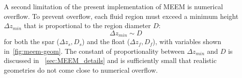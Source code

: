 


A second limitation of the present implementation of MEEM is numerical overflow.
To prevent overflow, each fluid region must exceed a minimum height $ \Delta z_{min}$ that is proportional to the region diameter $D$:
\begin{equation}\label{eq:delta-z-min-intro}
    \Delta z_{min} \sim D
\end{equation}
for both the spar ($\Delta z_s, D_s$) and the float ($\Delta z_f, D_f$), with variables shown in~\ref{fig:meem-geom}.
The constant of proportionality between $\Delta z_{min}$ and $D$ is discussed in \appendixname~\ref{sec:MEEM_details} and is sufficiently small that realistic geometries do not come close to numerical overflow. 

